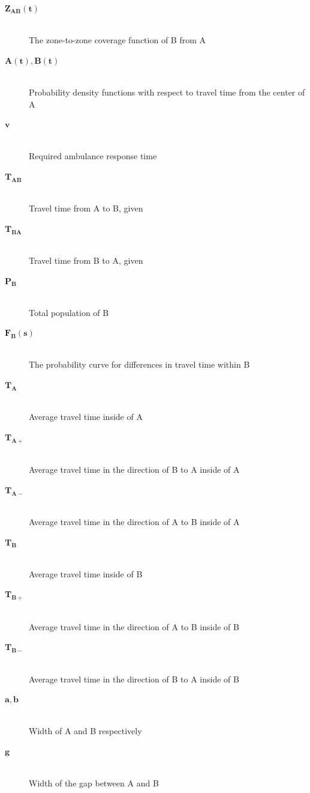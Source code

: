\documentclass[notitlepage, 12pt]{article}
\begin{document}
\begin{description}
    \item[$\mathbf{Z_{AB}(t)}$] \hfill \\
    	The zone-to-zone coverage function of B from A
    \item[$\mathbf{A(t), B(t)}$] \hfill \\
    	Probability density functions with respect to travel time from the center of A
    \item[$\mathbf{v}$] \hfill \\
    	Required ambulance response time
    \item[$\mathbf{T_{AB}}$] \hfill \\
    	Travel time from A to B, given
    \item[$\mathbf{T_{BA}}$] \hfill \\
    	Travel time from B to A, given
    \item[$\mathbf{P_B}$] \hfill \\
    	Total population of B
    \item[$\mathbf{F_B(s)}$] \hfill \\
    	The probability curve for differences in travel time within B
   \item[$\mathbf{T_A}$] \hfill \\
    	Average travel time inside of A
    \item[$\mathbf{T_{A+}}$] \hfill \\
    	Average travel time in the direction of B to A inside of A
    \item[$\mathbf{T_{A-}}$] \hfill \\
    	Average travel time in the direction of A to B inside of A
   \item[$\mathbf{T_B}$] \hfill \\
    	Average travel time inside of B
    \item[$\mathbf{T_{B+}}$] \hfill \\
    	Average travel time in the direction of A to B inside of B
    \item[$\mathbf{T_{B-}}$] \hfill \\
    	Average travel time in the direction of B to A inside of B
    \item[$\mathbf{a, b}$] \hfill \\
    	Width of A and B respectively
    \item[$\mathbf{g}$] \hfill \\
    	Width of the gap between A and B
\end{description}
\end{document}
